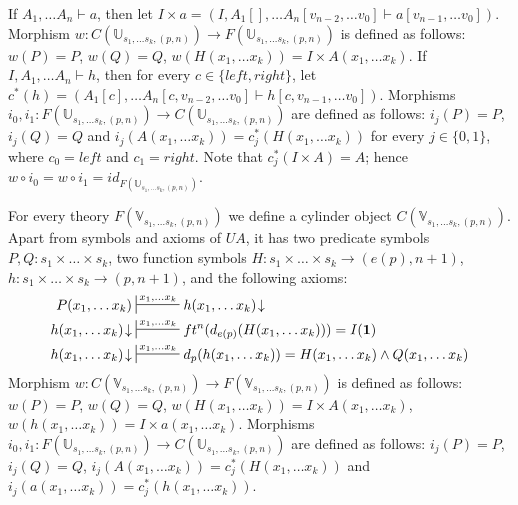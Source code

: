 \documentclass[reqno]{amsart}
\theoremstyle{definition}
\theoremstyle{remark}
\newcommand{\emptyCtx}{\mathbf{1}}
\newcommand{\I}{\mathrm{I}}
\newcommand{\J}{\mathrm{J}}
\numberwithin{figure}{section}
\begin{document}
If $A_1, \ldots A_n \vdash a$, then let $I \times a = (I, A_1[], \ldots A_n[v_{n-2}, \ldots v_0] \vdash a[v_{n-1}, \ldots v_0])$.
Morphism $w : C(\mathbb{U}_{s_1, \ldots s_k, (p,n)}) \to F(\mathbb{U}_{s_1, \ldots s_k, (p,n)})$ is defined as follows:
$w(P) = P$, $w(Q) = Q$, $w(H(x_1, \ldots x_k)) = I \times A(x_1, \ldots x_k)$.
If $I, A_1, \ldots A_n \vdash h$, then for every $c \in \{ left, right \}$, let $c^*(h) = (A_1[c], \ldots A_n[c, v_{n-2}, \ldots v_0] \vdash h[c, v_{n-1}, \ldots v_0])$.
Morphisms $i_0,i_1 : F(\mathbb{U}_{s_1, \ldots s_k, (p,n)}) \to C(\mathbb{U}_{s_1, \ldots s_k, (p,n)})$ are defined as follows:
$i_j(P) = P$, $i_j(Q) = Q$ and $i_j(A(x_1, \ldots x_k)) = c_j^*(H(x_1, \ldots x_k))$ for every $j \in \{ 0, 1 \}$, where $c_0 = left$ and $c_1 = right$.
Note that $c_j^*(I \times A) = A$; hence $w \circ i_0 = w \circ i_1 = id_{F(\mathbb{U}_{s_1, \ldots s_k, (p,n)})}$.

For every theory $F(\mathbb{V}_{s_1, \ldots s_k, (p,n)})$ we define a cylinder object $C(\mathbb{V}_{s_1, \ldots s_k, (p,n)})$.
Apart from symbols and axioms of $UA$, it has two predicate symbols $P,Q : s_1 \times \ldots \times s_k$,
two function symbols $H : s_1 \times \ldots \times s_k \to (e(p),n+1)$, $h : s_1 \times \ldots \times s_k \to (p,n+1)$, and the following axioms:
\begin{align*}
P(x_1, \ldots x_k) & \sststile{}{x_1, \ldots x_k} h(x_1, \ldots x_k)\!\downarrow \\
h(x_1, \ldots x_k)\!\downarrow & \sststile{}{x_1, \ldots x_k} ft^n(d_{e(p)}(H(x_1, \ldots x_k))) = I(\emptyCtx) \\
h(x_1, \ldots x_k)\!\downarrow & \sststile{}{x_1, \ldots x_k} d_p(h(x_1, \ldots x_k)) = H(x_1, \ldots x_k) \land Q(x_1, \ldots x_k)
\end{align*}
Morphism $w : C(\mathbb{V}_{s_1, \ldots s_k, (p,n)}) \to F(\mathbb{V}_{s_1, \ldots s_k, (p,n)})$ is defined as follows:
$w(P) = P$, $w(Q) = Q$, $w(H(x_1, \ldots x_k)) = I \times A(x_1, \ldots x_k)$, $w(h(x_1, \ldots x_k)) = I \times a(x_1, \ldots x_k)$.
Morphisms $i_0,i_1 : F(\mathbb{U}_{s_1, \ldots s_k, (p,n)}) \to C(\mathbb{U}_{s_1, \ldots s_k, (p,n)})$ are defined as follows:
$i_j(P) = P$, $i_j(Q) = Q$, $i_j(A(x_1, \ldots x_k)) = c_j^*(H(x_1, \ldots x_k))$ and  $i_j(a(x_1, \ldots x_k)) = c_j^*(h(x_1, \ldots x_k))$.




\end{document}
